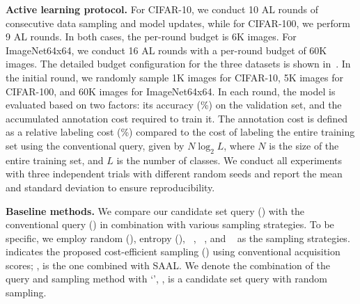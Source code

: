 \noindent\textbf{Active learning protocol.}
For CIFAR-10, we conduct 10 AL rounds of consecutive data sampling and model updates, while for CIFAR-100, we perform 9 AL rounds.
In both cases, the per-round budget is 6K images.
For ImageNet64x64, we conduct 16 AL rounds with a per-round budget of 60K images.
The detailed budget configuration for the three datasets is shown in~.
In the initial round, we randomly sample 1K images for CIFAR-10, 5K images for CIFAR-100, and 60K images for ImageNet64x64.
In each round, the model is evaluated based on two factors: its accuracy (\%) on the validation set, and the accumulated annotation cost required to train it.
The annotation cost is defined as a relative labeling cost (\%) compared to the cost of labeling the entire training set using the conventional query, given by $N \log_2{L}$, where $N$ is the size of the entire training set, and $L$ is the number of classes.
We conduct all experiments with three independent trials with different random seeds and report the mean and standard deviation to ensure reproducibility.

\noindent\textbf{Baseline methods.} 
We compare our candidate set query () with the conventional query () in combination with various sampling strategies.
To be specific, we employ random (), entropy (), ~\citep{ash2019deep}, ~\citep{yehuda2022active}, and ~\citep{kim2023saal} as the sampling strategies.
 indicates the proposed cost-efficient sampling () using conventional acquisition scores; \eg,  is the one combined with SAAL.
We denote the combination of the query and sampling method with `\sftype{+}', \eg,  is a candidate set query with random sampling. 

\begin{table}[t!]
    \caption{The results of the user study showing the annotation time (second) and accuracy (\%) for the same images with varying size of class options (candidate set).
    This result demonstrates that a small candidate set improves both labeling efficiency and accuracy.
    The results also align closely with theoretical costs, as shown in~(\emph{right}).}
    \label{tab:user-study}
    \centering
\end{table}

